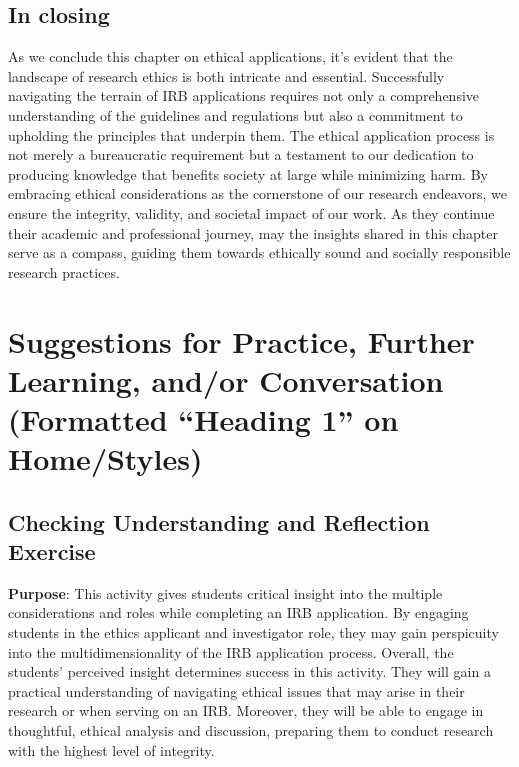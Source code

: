 \documentclass[
  11pt,
]{book}
\begin{document}
\subsection{In closing}\label{in-closing}

As we conclude this chapter on ethical applications, it's evident that the landscape of research ethics is both intricate and essential. Successfully navigating the terrain of IRB applications requires not only a comprehensive understanding of the guidelines and regulations but also a commitment to upholding the principles that underpin them. The ethical application process is not merely a bureaucratic requirement but a testament to our dedication to producing knowledge that benefits society at large while minimizing harm. By embracing ethical considerations as the cornerstone of our research endeavors, we ensure the integrity, validity, and societal impact of our work. As they continue their academic and professional journey, may the insights shared in this chapter serve as a compass, guiding them towards ethically sound and socially responsible research practices.

\section{Suggestions for Practice, Further Learning, and/or Conversation (Formatted ``Heading 1'' on Home/Styles)}\label{suggestions-for-practice-further-learning-andor-conversation-formatted-heading-1-on-homestyles}

\subsection{Checking Understanding and Reflection Exercise}\label{checking-understanding-and-reflection-exercise}

\textbf{Purpose}: This activity gives students critical insight into the multiple considerations and roles while completing an IRB application. By engaging students in the ethics applicant and investigator role, they may gain perspicuity into the multidimensionality of the IRB application process. Overall, the students' perceived insight determines success in this activity. They will gain a practical understanding of navigating ethical issues that may arise in their research or when serving on an IRB. Moreover, they will be able to engage in thoughtful, ethical analysis and discussion, preparing them to conduct research with the highest level of integrity.
\end{document}
